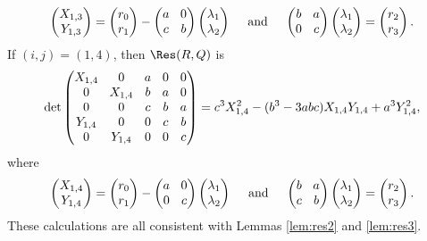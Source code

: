 \[\arraycolsep4.5pt
\begin{pmatrix}
X_{1,3}\\
Y_{1,3}\end{pmatrix}
=\begin{pmatrix}
r_0\\
r_1\end{pmatrix}
-\begin{pmatrix}
a & 0 \\
c & b
\end{pmatrix}\begin{pmatrix}
\lambda_1 \\
\lambda_2 \end{pmatrix}\quad\text{ and }\quad\begin{pmatrix}
b & a \\
0 & c
\end{pmatrix}\begin{pmatrix}
\lambda_1 \\
\lambda_2
\end{pmatrix}=\begin{pmatrix}
r_2 \\
r_3
\end{pmatrix}.
\]
If $(i,j)=(1,4)$, then $\Res(R,Q)$ is
\[\arraycolsep4.5pt
\det\begin{pmatrix}
X_{1,4} & 0 & a& 0& 0 \\
0 & X_{1,4}& b& a& 0 \\
0 & 0& c& b& a \\
Y_{1,4} & 0& 0& c& b \\
0 & Y_{1,4}& 0& 0& c \\
\end{pmatrix}=c^3 X_{1,4}^2 - (b^3 - 3 a b c) X_{1,4} Y_{1,4} + a^3 Y_{1,4}^2,
\]
where
\[\arraycolsep4.5pt
\begin{pmatrix}
X_{1,4}\\
Y_{1,4}\end{pmatrix}
=\begin{pmatrix}
r_0\\
r_1\end{pmatrix}
-\begin{pmatrix}
a & 0 \\
0 & c
\end{pmatrix}\begin{pmatrix}
\lambda_1 \\
\lambda_2
\end{pmatrix}\quad\text{ and }\quad\begin{pmatrix}
b & a \\
c & b
\end{pmatrix}\begin{pmatrix}
\lambda_1 \\
\lambda_2
\end{pmatrix}=\begin{pmatrix}
r_2 \\
r_3
\end{pmatrix}.
\]
These calculations are all consistent with Lemmas \ref{lem:res2} and \ref{lem:res3}.

